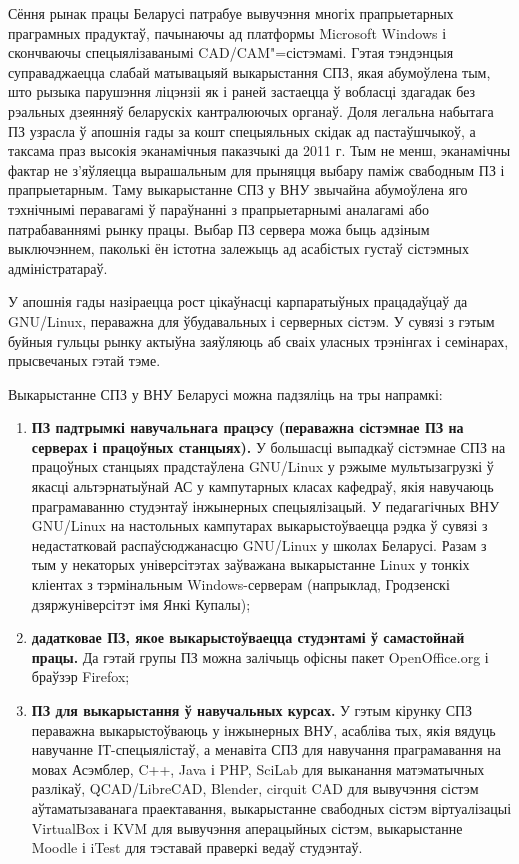 \documentclass[10pt, a5paper]{article}
\begin{document}
Сёння рынак працы Беларусі патрабуе вывучэння многіх прапрыетарных праграмных прадуктаў, пачынаючы ад платформы Microsoft Windows і скончваючы спецыялізаванымі CAD/CAM"=сістэмамі. Гэтая тэндэнцыя суправаджаецца слабай матывацыяй выкарыстання СПЗ, якая абумоўлена тым, што рызыка парушэння ліцэнзіі як і раней застаецца ў вобласці здагадак без рэальных дзеянняў беларускіх кантралюючых органаў. Доля легальна набытага ПЗ узрасла ў апошнія гады за кошт спецыяльных скідак ад пастаўшчыкоў, а таксама праз высокія эканамічныя паказчыкі да 2011 г. Тым не менш, эканамічны фактар не з'яўляецца вырашальным для прыняцця выбару паміж свабодным ПЗ і прапрыетарным. Таму выкарыстанне СПЗ у ВНУ звычайна абумоўлена яго тэхнічнымі перавагамі ў параўнанні з прапрыетарнымі аналагамі або патрабаваннямі рынку працы. Выбар ПЗ сервера можа быць адзіным выключэннем, паколькі ён істотна залежыць ад асабістых густаў сістэмных адміністратараў.

У апошнія гады назіраецца рост цікаўнасці карпаратыўных працадаўцаў да GNU/Linux, пераважна для ўбудавальных і серверных сістэм. У сувязі з гэтым буйныя гульцы рынку актыўна заяўляюць аб сваіх уласных трэнінгах і семінарах, прысвечаных гэтай тэме.

Выкарыстанне СПЗ у ВНУ Беларусі можна падзяліць на тры напрамкі:

\begin{enumerate}
  \item \textbf{ПЗ падтрымкі навучальнага працэсу (пераважна сістэмнае ПЗ на серверах і працоўных станцыях).} У большасці выпадкаў сістэмнае СПЗ на працоўных станцыях прадстаўлена GNU/Linux у рэжыме мультызагрузкі ў якасці альтэрнатыўнай АС у кампутарных класах кафедраў, якія навучаюць праграмаванню студэнтаў інжынерных спецыялізацый. У педагагічных ВНУ GNU/Linux на настольных кампутарах выкарыстоўваецца рэдка ў сувязі з недастатковай распаўсюджанасцю GNU/Linux у школах Беларусі. Разам з тым у некаторых універсітэтах заўважана выкарыстанне Linux у тонкіх кліентах з тэрмінальным Windows-серверам (напрыклад, Гродзенскі дзяржуніверсітэт імя Янкі Купалы);
  \item \textbf{дадатковае ПЗ, якое выкарыстоўваецца студэнтамі ў самастойнай працы.} Да гэтай групы ПЗ можна залічыць офісны пакет OpenOffice.org і браўзэр Firefox;
  \item \textbf{ПЗ для выкарыстання ў навучальных курсах.} У гэтым кірунку СПЗ пераважна выкарыстоўваюць у інжынерных ВНУ, асабліва тых, якія вядуць навучанне ІТ-спецыялістаў, а менавіта СПЗ для навучання праграмавання на мовах Асэмблер, C++, Java і PHP, SciLab для выканання матэматычных разлікаў, QCAD/LibreCAD, Blender, cirquit CAD для вывучэння сістэм аўтаматызаванага праектавання, выкарыстанне свабодных сістэм віртуалізацыі VirtualBox і KVM для вывучэння аперацыйных сістэм, выкарыстанне Moodle і iTest для тэставай праверкі ведаў студэнтаў.
\end{enumerate}
\end{document}
